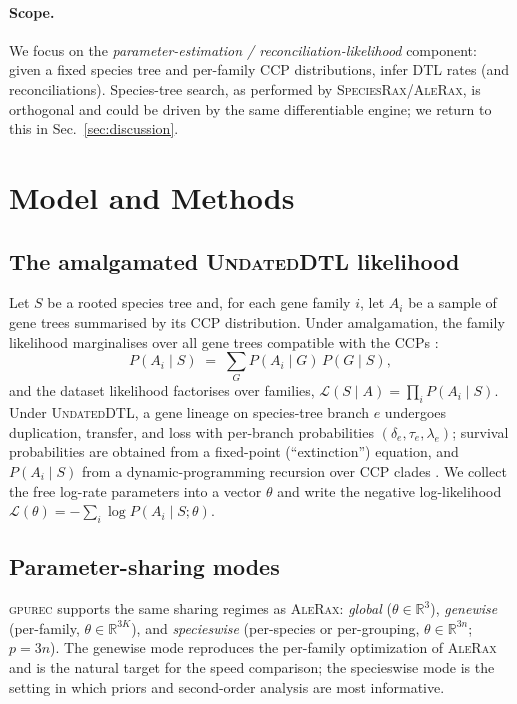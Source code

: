 \documentclass[11pt]{article}
\newcommand{\toolname}{\textsc{gpurec}\xspace}
\newcommand{\bdelta}{\delta}
\newcommand{\btau}{\tau}
\newcommand{\blambda}{\lambda}
\newcommand{\NLL}{\mathcal{L}}
\newcommand{\Real}{\mathbb{R}}
\begin{document}
\paragraph{Scope.} We focus on the \emph{parameter-estimation /
reconciliation-likelihood} component: given a fixed species tree and per-family
CCP distributions, infer DTL rates (and reconciliations). Species-tree search,
as performed by \textsc{SpeciesRax}/\textsc{AleRax}, is orthogonal and could be
driven by the same differentiable engine; we return to this in
Sec.~\ref{sec:discussion}.

\section{Model and Methods}
\label{sec:methods}

\subsection{The amalgamated \textsc{UndatedDTL} likelihood}
\label{sec:lik}
Let $S$ be a rooted species tree and, for each gene family $i$, let $A_i$ be a
sample of gene trees summarised by its CCP distribution. Under amalgamation,
the family likelihood marginalises over all gene trees compatible with the CCPs
\citep{Szollosi2013}:
\begin{equation}
  P(A_i \mid S) \;=\; \sum_{G} P(A_i \mid G)\, P(G \mid S),
  \label{eq:amalg}
\end{equation}
and the dataset likelihood factorises over families,
$\mathcal{L}(S \mid A) = \prod_i P(A_i \mid S)$. Under \textsc{UndatedDTL}, a
gene lineage on species-tree branch $e$ undergoes duplication, transfer, and
loss with per-branch probabilities $(\bdelta_e,\btau_e,\blambda_e)$; survival
probabilities are obtained from a fixed-point (``extinction'') equation, and
$P(A_i\mid S)$ from a dynamic-programming recursion over CCP clades
\citep{Szollosi2013,Morel2020}. We collect the free log-rate parameters into a
vector $\theta$ and write the negative log-likelihood
$\NLL(\theta) = -\sum_i \log P(A_i \mid S;\theta)$.

\subsection{Parameter-sharing modes}
\label{sec:modes}
\toolname supports the same sharing regimes as \textsc{AleRax}: \emph{global}
($\theta\in\Real^{3}$), \emph{genewise} (per-family, $\theta\in\Real^{3K}$),
and \emph{specieswise} (per-species or per-grouping, $\theta\in\Real^{3n}$;
$p=3n$). The genewise mode reproduces the per-family optimization of
\textsc{AleRax} and is the natural target for the speed comparison; the
specieswise mode is the setting in which priors and second-order analysis are
most informative.
\end{document}
